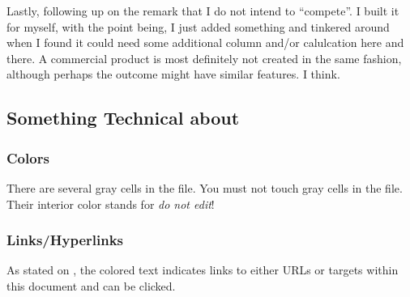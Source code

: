 Lastly, following up on the remark that I do not intend to "`compete"'.
I built it for myself, with the point being, I just added something and tinkered around when I found it could need some additional column and/or calulcation here and there.
A commercial product is most definitely not created in the same fashion, although perhaps the outcome might have similar features.
I think.

\subsection{Something Technical about \tfn}
\label{subsec:introduction-something-technical}

\subsubsection{Colors}
\label{subsubsec:colors}

There are several gray cells in the file.
You must not touch gray cells in the file.
Their interior color stands for \emph{do not edit}!

\subsubsection{Links/Hyperlinks}
\label{subsubsec:links-hyperlinks}

As stated on , the colored text indicates links to either URLs or targets within this document and can be clicked.
